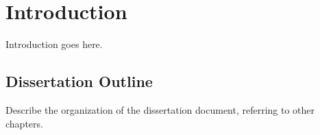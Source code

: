 
\chapter{Introduction}
\label{chapter:introduction}
Introduction goes here.

\section{Dissertation Outline}
Describe the organization of the dissertation document, referring to other chapters.
